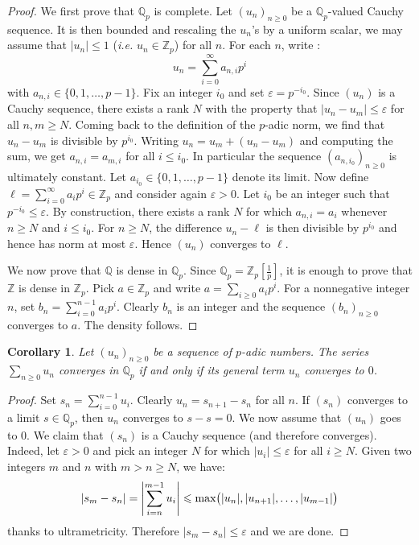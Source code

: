 \documentclass[11pt]{article}
\numberwithin{equation}{section}
\numberwithin{figure}{section}
\renewcommand{\leq}{\leqslant}
\renewcommand{\geq}{\geqslant}
\newtheorem{cor}[theo]{Corollary}
\theoremstyle{definition}
\newcommand{\Z}{\mathbb Z}
\newcommand{\Zp}{\Z_p}
\newcommand{\Q}{\mathbb Q}
\newcommand{\Qp}{\Q_p}
\renewcommand{\max}{\text{\rm max}}
\begin{document}
\begin{proof}
We first prove that $\Qp$ is complete. Let $(u_n)_{n \geq 0}$ be
a $\Qp$-valued Cauchy sequence. It is then bounded and rescaling the
$u_n$'s by a uniform scalar, we may assume that $|u_n| \leq 1$ 
(\emph{i.e.} $u_n \in \Zp$) for all $n$. 
For each $n$, write :
$$u_n = \sum_{i=0}^\infty a_{n,i} p^i$$
with $a_{n,i} \in \{0, 1, \ldots, p{-}1\}$. Fix an integer $i_0$ and
set $\varepsilon = p^{-i_0}$. Since $(u_n)$ is a Cauchy sequence, there
exists a rank $N$ with the property that $|u_n - u_m| \leq \varepsilon$
for all $n,m \geq N$. Coming back to the definition of the $p$-adic
norm, we find that $u_n - u_m$ is divisible by $p^{i_0}$. Writing $u_n = u_m 
+ (u_n - u_m)$ and computing the sum, we get $a_{n,i} = a_{m,i}$ for all 
$i \leq i_0$. In particular the sequence $(a_{n,i_0})_{n \geq 0}$ is 
ultimately constant. Let $a_{i_0} \in \{0, 1, \ldots, p{-}1\}$ denote its 
limit.
Now define $\ell = \sum_{i=0}^\infty a_i p^i \in \Zp$ and
consider again $\varepsilon > 0$. Let $i_0$ be an integer such that
$p^{-i_0} \leq \varepsilon$. By construction, there exists a rank $N$
for which $a_{n,i} = a_i$ whenever $n \geq N$ and $i \leq i_0$. For
$n \geq N$, the difference $u_n - \ell$ is then divisible by $p^{i_0}$
and hence has norm at most $\varepsilon$. Hence $(u_n)$ converges to 
$\ell$.

We now prove that $\Q$ is dense in $\Qp$. Since $\Qp = \Zp[\frac 1 p]$, 
it is enough to prove that $\Z$ is dense in $\Zp$. Pick $a \in \Zp$ and
write $a = \sum_{i \geq 0} a_i p^i$. For a nonnegative integer $n$, set
$b_n = \sum_{i=0}^{n-1} a_i p^i$. Clearly $b_n$ is an integer and the
sequence $(b_n)_{n \geq 0}$ converges to $a$. The density follows.
\end{proof}

\begin{cor}
\label{cor:convseries}
Let $(u_n)_{n \geq 0}$ be a sequence of $p$-adic numbers. The series 
$\sum_{n \geq 0} u_n$ converges in $\Qp$ if and only if its general
term $u_n$ converges to $0$.
\end{cor}

\begin{proof}
Set $s_n = \sum_{i=0}^{n-1} u_i$. Clearly $u_n = s_{n+1} - s_n$ for
all $n$. If $(s_n)$ converges to a limit $s \in \Qp$, then $u_n$ converges 
to $s-s = 0$.
We now assume that $(u_n)$ goes to $0$. We claim that
$(s_n)$ is a Cauchy sequence (and therefore converges). 
Indeed, let $\varepsilon > 0$ and pick an integer $N$ for which $|u_i| \leq
\varepsilon$ for all $i \geq N$. Given two integers $m$ and $n$
with $m > n \geq N$, we have:
$$|s_m - s_n| = \left|\sum_{i=n}^{m-1} u_i \right| \leq
\max \big(|u_n|, |u_{n+1}|, \ldots, |u_{m-1}|\big)$$
thanks to ultrametricity. Therefore $|s_m - s_n| \leq \varepsilon$
and we are done.
\end{proof}
\end{document}
